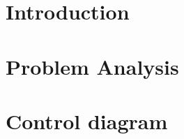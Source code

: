 %
%
%
%
% 





%
%
\chapter{Introduction}\label{ch:introduction}
    
    
    

    
    
%
%
\chapter{Problem Analysis}\label{ch:PA}
    
    
    
    
    
    

%
%

    

%
%
\chapter{Control diagram}\label{ch:design}
    
